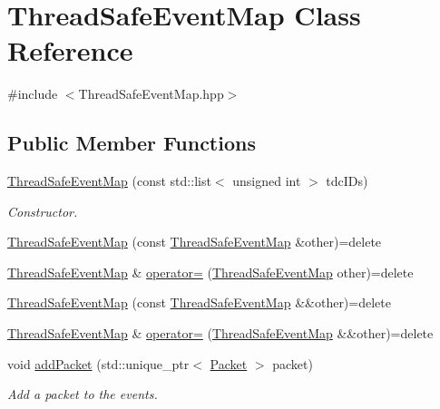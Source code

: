 \hypertarget{class_thread_safe_event_map}{}\section{Thread\+Safe\+Event\+Map Class Reference}
\label{class_thread_safe_event_map}


{\ttfamily \#include $<$Thread\+Safe\+Event\+Map.\+hpp$>$}

\subsection*{Public Member Functions}
\begin{DoxyCompactItemize}
\item 
\hyperlink{class_thread_safe_event_map_ace03ee2a6017dfee50a61c68626d2345}{Thread\+Safe\+Event\+Map} (const std\+::list$<$ unsigned int $>$ tdc\+I\+Ds)
\begin{DoxyCompactList}\small\item\em Constructor. \end{DoxyCompactList}\item 
\hyperlink{class_thread_safe_event_map_a523d5bf6c632e3803e721ef3fd94e318}{Thread\+Safe\+Event\+Map} (const \hyperlink{class_thread_safe_event_map}{Thread\+Safe\+Event\+Map} \&other)=delete
\item 
\hyperlink{class_thread_safe_event_map}{Thread\+Safe\+Event\+Map} \& \hyperlink{class_thread_safe_event_map_a1d438208fcc3936dd4384a8a2b55bdf8}{operator=} (\hyperlink{class_thread_safe_event_map}{Thread\+Safe\+Event\+Map} other)=delete
\item 
\hyperlink{class_thread_safe_event_map_af28959f5fbd84f00d227d10e1b37e5e5}{Thread\+Safe\+Event\+Map} (const \hyperlink{class_thread_safe_event_map}{Thread\+Safe\+Event\+Map} \&\&other)=delete
\item 
\hyperlink{class_thread_safe_event_map}{Thread\+Safe\+Event\+Map} \& \hyperlink{class_thread_safe_event_map_a6bf7640fde19d7d6d4dedd5b06c09f84}{operator=} (\hyperlink{class_thread_safe_event_map}{Thread\+Safe\+Event\+Map} \&\&other)=delete
\item 
void \hyperlink{class_thread_safe_event_map_aafd485696f0a50da8afa864f04f0aa07}{add\+Packet} (std\+::unique\+\_\+ptr$<$ \hyperlink{class_packet}{Packet} $>$ packet)
\begin{DoxyCompactList}\small\item\em Add a packet to the events. \end{DoxyCompactList}\item 

\end{DoxyCompactItemize}

